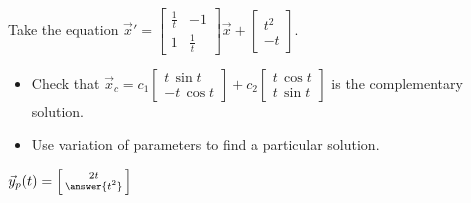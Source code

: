 \documentclass{ximera}
\begin{document}

\begin{exercise}
    Take the equation 
    $\displaystyle {\vec{x}}' =
    \begin{bmatrix}
        \frac{1}{t} & -1 \\
        1 & \frac{1}{t}
    \end{bmatrix}
    \vec{x} + \begin{bmatrix} t^2 \\ -t \end{bmatrix} .$
    \begin{itemize}
        \item Check that
            $\displaystyle \vec{x}_c = c_1
            \begin{bmatrix}
                t\, \sin t \\
                - t \, \cos t
            \end{bmatrix}
            + c_2
            \begin{bmatrix}
                t\, \cos t \\
                t \, \sin t
            \end{bmatrix}$
            is the complementary solution.
        \item Use variation of parameters to find a particular solution.
    \end{itemize}
    $\vec{y}_p(t) = \left[\begin{smallmatrix} 2t \\ \answer{t^2} \end{smallmatrix}\right]$
\end{exercise}

\end{document}
